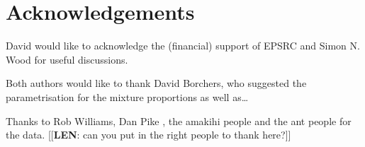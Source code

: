 \documentclass[useAMS,referee, usegraphicx]{biom}
\begin{document}
\backmatter


\section*{Acknowledgements}

David would like to acknowledge the (financial) support of EPSRC and Simon N. Wood for useful discussions.

Both authors would like to thank David Borchers, who suggested the parametrisation for the mixture proportions as well as\ldots

Thanks to Rob Williams, Dan Pike , the amakihi people and the ant people for the data. [[\textbf{LEN}: can you put in the right people to thank here?]]



\end{document}
